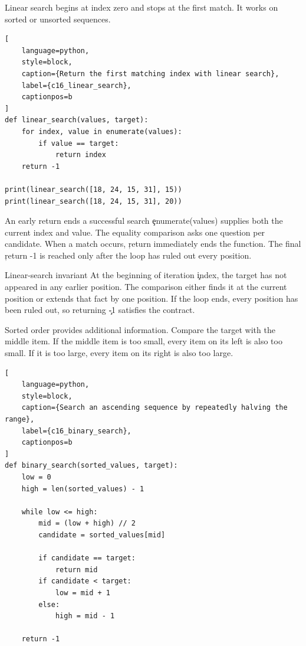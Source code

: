 Linear search begins at index zero and stops at the first match. It works on
sorted or unsorted sequences.

\begin{lstlisting}[
    language=python,
    style=block,
    caption={Return the first matching index with linear search},
    label={c16_linear_search},
    captionpos=b
]
def linear_search(values, target):
    for index, value in enumerate(values):
        if value == target:
            return index
    return -1

print(linear_search([18, 24, 15, 31], 15))
print(linear_search([18, 24, 15, 31], 20))
\end{lstlisting}

\begin{SyntaxBox}{An early return ends a successful search}
\c{enumerate(values)} supplies both the current index and value. The equality
comparison asks one question per candidate. When a match occurs, \c{return}
immediately ends the function. The final \c{return -1} is reached only after
the loop has ruled out every position.
\end{SyntaxBox}

\begin{ExplainBox}{Linear-search invariant}
At the beginning of iteration \c{index}, the target has not appeared in any
earlier position. The comparison either finds it at the current position or
extends that fact by one position. If the loop ends, every position has been
ruled out, so returning \c{-1} satisfies the contract.
\end{ExplainBox}


Sorted order provides additional information. Compare the target with the
middle item. If the middle item is too small, every item on its left is also
too small. If it is too large, every item on its right is also too large.

\begin{lstlisting}[
    language=python,
    style=block,
    caption={Search an ascending sequence by repeatedly halving the range},
    label={c16_binary_search},
    captionpos=b
]
def binary_search(sorted_values, target):
    low = 0
    high = len(sorted_values) - 1

    while low <= high:
        mid = (low + high) // 2
        candidate = sorted_values[mid]

        if candidate == target:
            return mid
        if candidate < target:
            low = mid + 1
        else:
            high = mid - 1

    return -1
\end{lstlisting}

